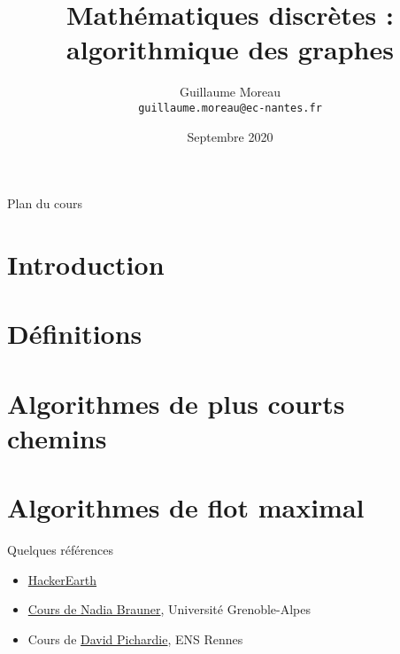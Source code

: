 \documentclass[allowframebreaks,xcolor=dvipsnames]{beamer}
\title[Option INFO / MADIS] %
{Mathématiques discrètes : algorithmique des graphes}
\author[G. Moreau]{Guillaume Moreau\\
\texttt{guillaume.moreau@ec-nantes.fr}}
\institute[Ecole Centrale de Nantes] %
{
  Ecole Centrale de Nantes
}
\date %
{Septembre 2020}
\begin{document}
\begin{frame}
  \titlepage
\end{frame}

\begin{frame}[allowframebreaks]{Plan du cours}
  \tableofcontents[hideallsubsections]
\end{frame}



\section{Introduction}


\section{Définitions}





\section{Algorithmes de plus courts chemins}


\section{Algorithmes de flot maximal}


\begin{frame}{Quelques références}
  \begin{itemize}
    \item \href{https://www.hackerearth.com/fr/practice/algorithms/graphs/graph-representation/tutorial/}{HackerEarth}
    \item \href{https://caseine.org/course/view.php?id=147}{Cours de Nadia Brauner}, Université Grenoble-Alpes 
    \item Cours de \href{https://people.irisa.fr/David.Pichardie/}{David Pichardie}, ENS Rennes 
  \end{itemize}
\end{frame}
\end{document}
